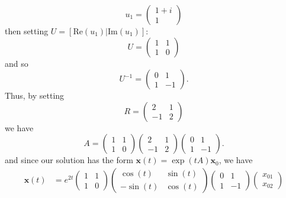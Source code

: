 \documentclass{article}
\begin{document}
\begin{itemize}
\begin{itemize}
        \[u_1 = \begin{pmatrix}
            1 + i\\
            1
        \end{pmatrix}\]
        then setting $U = [\text{Re}(u_1) | \text{Im}(u_1)]$:
        \[U = \begin{pmatrix}
            1 & 1\\
            1 & 0
        \end{pmatrix}\]
        and so
        \[U^{-1} = \begin{pmatrix}
            0 & 1\\
            1 & -1
        \end{pmatrix}.\]
        Thus, by setting
        \[R = \begin{pmatrix}
            2 & 1\\
            -1 & 2
        \end{pmatrix}\]
        we have
        \[A = \begin{pmatrix}
            1 & 1\\
            1 & 0
        \end{pmatrix}\begin{pmatrix}
            2 & 1\\
            -1 & 2
        \end{pmatrix}\begin{pmatrix}
            0 & 1\\
            1 & -1
        \end{pmatrix}.\]
        and since our solution has the form $\mathbf{x}(t) = \exp(tA)\mathbf{x}_0$, we have
        \begin{align*}
            \mathbf{x}(t) &= e^{2t}\begin{pmatrix}
                1 & 1\\
                1 & 0
            \end{pmatrix}\begin{pmatrix}
                \cos(t) & \sin(t)\\
                -\sin(t) & \cos(t)
            \end{pmatrix}\begin{pmatrix}
                0 & 1\\
                1 & -1
            \end{pmatrix}\begin{pmatrix}
                x_{01}\\
                x_{02}
            \end{pmatrix}\\

\end{align*}
\end{itemize}
\end{itemize}
\end{document}
